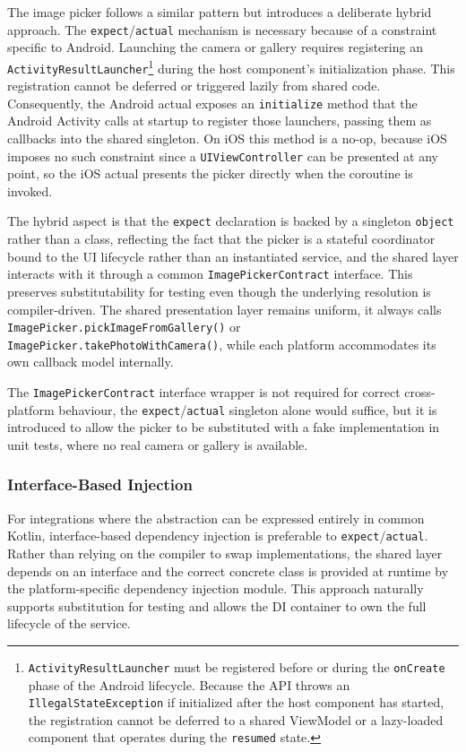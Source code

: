 The image picker follows a similar pattern but introduces a deliberate hybrid approach.
The \texttt{expect}/\texttt{actual} mechanism is necessary because of a constraint specific to Android. Launching the camera or gallery requires registering an \texttt{ActivityResultLauncher}\footnote{\texttt{ActivityResultLauncher} must be registered before or during the \texttt{onCreate} phase of the Android lifecycle. Because the API throws an \texttt{IllegalStateException} if initialized after the host component has started, the registration cannot be deferred to a shared ViewModel or a lazy-loaded component that operates during the \texttt{resumed} state.} during the host component's initialization phase. This registration cannot be deferred or triggered lazily from shared code.
Consequently, the Android actual exposes an \texttt{initialize} method that the Android Activity calls at startup to register those launchers, passing them as callbacks into the shared singleton.
On iOS this method is a no-op, because iOS imposes no such constraint since a \texttt{UIViewController} can be presented at any point, so the iOS actual presents the picker directly when the coroutine is invoked.

The hybrid aspect is that the \texttt{expect} declaration is backed by a singleton \texttt{object} rather than a class, reflecting the fact that the picker is a stateful coordinator bound to the UI lifecycle rather than an instantiated service, and the shared layer interacts with it through a common \texttt{ImagePickerContract} interface.
This preserves substitutability for testing even though the underlying resolution is compiler-driven.
The shared presentation layer remains uniform, it always calls \texttt{ImagePicker.pickImageFromGallery()} or \texttt{ImagePicker.takePhotoWithCamera()}, while each platform accommodates its own callback model internally.

The \texttt{ImagePickerContract} interface wrapper is not required for correct cross-platform behaviour, the \texttt{expect}/\texttt{actual} singleton alone would suffice, but it is introduced to allow the picker to be substituted with a fake implementation in unit tests, where no real camera or gallery is available.

\subsubsection{Interface-Based Injection}

For integrations where the abstraction can be expressed entirely in common Kotlin, interface-based dependency injection is preferable to \texttt{expect}/\texttt{actual}.
Rather than relying on the compiler to swap implementations, the shared layer depends on an interface and the correct concrete class is provided at runtime by the platform-specific dependency injection module.
This approach naturally supports substitution for testing and allows the DI container to own the full lifecycle of the service.

